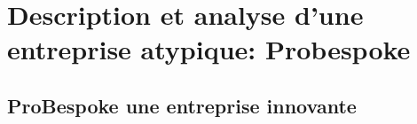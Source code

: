 \chapter{Description et analyse d'une entreprise atypique: Probespoke}
\section{ProBespoke une entreprise innovante}
